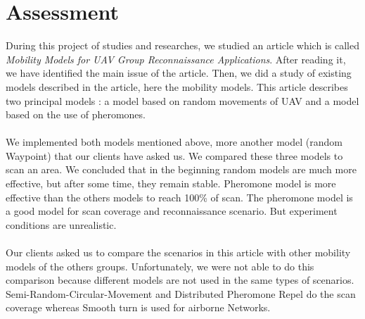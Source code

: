 \part{Assessment}

During this project of studies and researches, we studied an article which is called \textit{Mobility Models for UAV Group Reconnaissance Applications}. After reading it, we have identified the main issue of the article. Then, we did a study of existing models described in the article, here the mobility models. This article describes two principal models : a model based on random movements of UAV and a model based on the use of pheromones.\\\\
We implemented both models mentioned above, more another model (random Waypoint) that our clients have asked us. We compared these three models to scan an area. We concluded that in the beginning random models are much more effective, but after some time, they remain stable. Pheromone model is more effective than the others models to reach 100\% of scan. The pheromone model is a good model for scan coverage and reconnaissance scenario. But experiment conditions are unrealistic.\\\\
Our clients asked us to compare the scenarios in this article with other mobility models of the others groups.
Unfortunately, we were not able to do this comparison because different models are not used in the same types of scenarios. Semi-Random-Circular-Movement and Distributed Pheromone Repel do the scan coverage whereas Smooth turn is used for airborne Networks.



